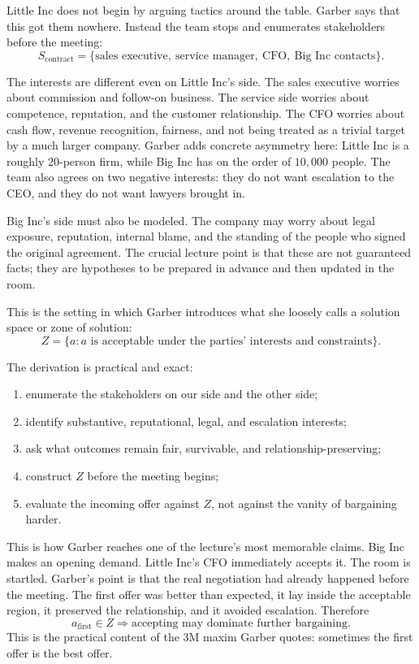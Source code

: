 Little Inc does not begin by arguing tactics around the table. Garber says that this got them nowhere. Instead the team stops and enumerates stakeholders before the meeting:
\begin{equation}
S_{\text{contract}} =
\{\text{sales executive},\ \text{service manager},\ \text{CFO},\ \text{Big Inc contacts}\}.
\end{equation}

The interests are different even on Little Inc's side. The sales executive worries about commission and follow-on business. The service side worries about competence, reputation, and the customer relationship. The CFO worries about cash flow, revenue recognition, fairness, and not being treated as a trivial target by a much larger company. Garber adds concrete asymmetry here: Little Inc is a roughly \(20\)-person firm, while Big Inc has on the order of \(10{,}000\) people. The team also agrees on two negative interests: they do not want escalation to the CEO, and they do not want lawyers brought in.

Big Inc's side must also be modeled. The company may worry about legal exposure, reputation, internal blame, and the standing of the people who signed the original agreement. The crucial lecture point is that these are not guaranteed facts; they are hypotheses to be prepared in advance and then updated in the room.

This is the setting in which Garber introduces what she loosely calls a solution space or zone of solution:
\begin{equation}
Z = \{a : a \text{ is acceptable under the parties' interests and constraints}\}.
\end{equation}

The derivation is practical and exact:
\begin{enumerate}
\item enumerate the stakeholders on our side and the other side;
\item identify substantive, reputational, legal, and escalation interests;
\item ask what outcomes remain fair, survivable, and relationship-preserving;
\item construct \(Z\) before the meeting begins;
\item evaluate the incoming offer against \(Z\), not against the vanity of bargaining harder.
\end{enumerate}

This is how Garber reaches one of the lecture's most memorable claims. Big Inc makes an opening demand. Little Inc's CFO immediately accepts it. The room is startled. Garber's point is that the real negotiation had already happened before the meeting. The first offer was better than expected, it lay inside the acceptable region, it preserved the relationship, and it avoided escalation. Therefore
\begin{equation}
a_{\text{first}} \in Z \Longrightarrow \text{accepting may dominate further bargaining.}
\end{equation}
This is the practical content of the 3M maxim Garber quotes: sometimes the first offer is the best offer.


